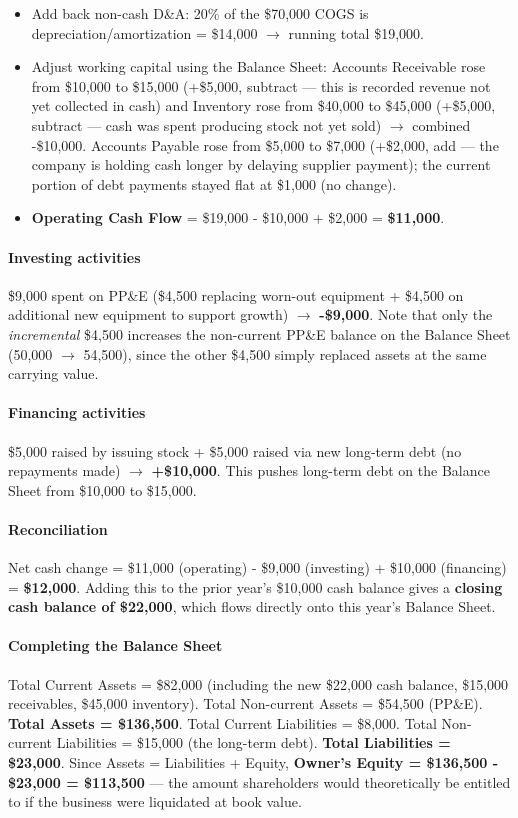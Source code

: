 \documentclass[12pt,openany]{book}
\begin{document}
\begin{itemize}[leftmargin=*]
    \item Add back non-cash D\&A: 20\% of the \$70,000 COGS is depreciation/amortization = \$14,000 \(\to\) running total \$19,000.
    \item Adjust working capital using the Balance Sheet: Accounts Receivable rose from \$10,000 to \$15,000 (+\$5,000, subtract --- this is recorded revenue not yet collected in cash) and Inventory rose from \$40,000 to \$45,000 (+\$5,000, subtract --- cash was spent producing stock not yet sold) \(\to\) combined -\$10,000. Accounts Payable rose from \$5,000 to \$7,000 (+\$2,000, add --- the company is holding cash longer by delaying supplier payment); the current portion of debt payments stayed flat at \$1,000 (no change).
    \item \textbf{Operating Cash Flow} = \$19,000 - \$10,000 + \$2,000 = \textbf{\$11,000}.
\end{itemize}

\paragraph{Investing activities} \$9,000 spent on PP\&E (\$4,500 replacing worn-out equipment + \$4,500 on additional new equipment to support growth) \(\to\) \textbf{-\$9,000}. Note that only the \emph{incremental} \$4,500 increases the non-current PP\&E balance on the Balance Sheet (50,000 \(\to\) 54,500), since the other \$4,500 simply replaced assets at the same carrying value.

\paragraph{Financing activities} \$5,000 raised by issuing stock + \$5,000 raised via new long-term debt (no repayments made) \(\to\) \textbf{+\$10,000}. This pushes long-term debt on the Balance Sheet from \$10,000 to \$15,000.

\paragraph{Reconciliation} Net cash change = \$11,000 (operating) - \$9,000 (investing) + \$10,000 (financing) = \textbf{\$12,000}. Adding this to the prior year's \$10,000 cash balance gives a \textbf{closing cash balance of \$22,000}, which flows directly onto this year's Balance Sheet.

\paragraph{Completing the Balance Sheet} Total Current Assets = \$82,000 (including the new \$22,000 cash balance, \$15,000 receivables, \$45,000 inventory). Total Non-current Assets = \$54,500 (PP\&E). \textbf{Total Assets = \$136,500}. Total Current Liabilities = \$8,000. Total Non-current Liabilities = \$15,000 (the long-term debt). \textbf{Total Liabilities = \$23,000}. Since Assets = Liabilities + Equity, \textbf{Owner's Equity = \$136,500 - \$23,000 = \$113,500} --- the amount shareholders would theoretically be entitled to if the business were liquidated at book value.
\end{document}
